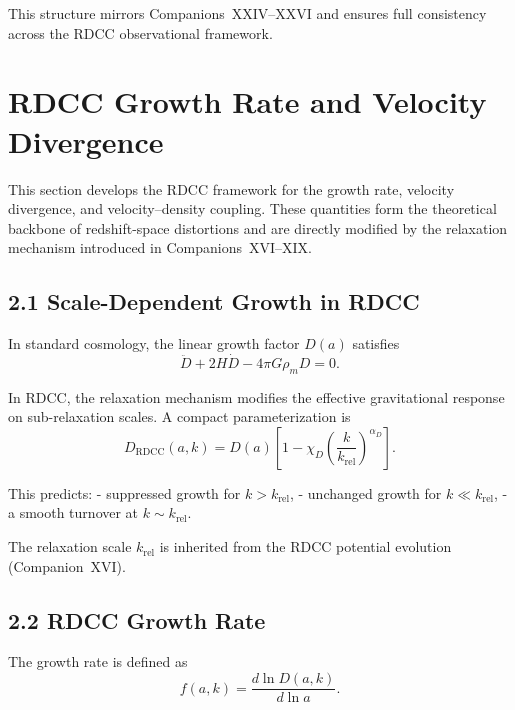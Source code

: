 \documentclass[11pt,a4paper]{article}
\begin{document}
This structure mirrors Companions~XXIV–XXVI and ensures full consistency across the
RDCC observational framework.


\section{RDCC Growth Rate and Velocity Divergence}

This section develops the RDCC framework for the growth rate, velocity divergence, and
velocity–density coupling. These quantities form the theoretical backbone of redshift-space
distortions and are directly modified by the relaxation mechanism introduced in
Companions~XVI–XIX.

\subsection{2.1 Scale-Dependent Growth in RDCC}

In standard cosmology, the linear growth factor $D(a)$ satisfies
\begin{equation}
\ddot{D} + 2H\dot{D} - 4\pi G\rho_{m}D = 0.
\end{equation}

In RDCC, the relaxation mechanism modifies the effective gravitational response on
sub-relaxation scales. A compact parameterization is
\begin{equation}
D_{\mathrm{RDCC}}(a,k)
=
D(a)
\left[
1
-
\chi_{D}
\left(
\frac{k}{k_{\mathrm{rel}}}
\right)^{\alpha_{D}}
\right].
\end{equation}

This predicts:
- suppressed growth for $k > k_{\mathrm{rel}}$,  
- unchanged growth for $k \ll k_{\mathrm{rel}}$,  
- a smooth turnover at $k \sim k_{\mathrm{rel}}$.

The relaxation scale $k_{\mathrm{rel}}$ is inherited from the RDCC potential evolution
(Companion~XVI).

\subsection{2.2 RDCC Growth Rate}

The growth rate is defined as
\begin{equation}
f(a,k)
=
\frac{d\ln D(a,k)}{d\ln a}.
\end{equation}
\end{document}
